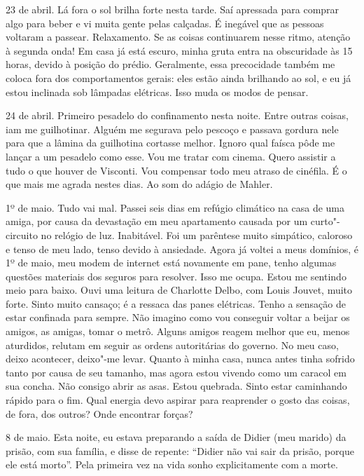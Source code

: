 23 de abril. Lá fora o sol brilha forte nesta tarde. Saí apressada para
comprar algo para beber e vi muita gente pelas calçadas. É inegável que
as pessoas voltaram a passear. Relaxamento. Se as coisas continuarem
nesse ritmo, atenção à segunda onda! Em casa já está escuro, minha gruta
entra na obscuridade às 15 horas, devido à posição do prédio.
Geralmente, essa precocidade também me coloca fora dos comportamentos
gerais: eles estão ainda brilhando ao sol, e eu já estou inclinada sob
lâmpadas elétricas. Isso muda os modos de pensar.

24 de abril. Primeiro pesadelo do confinamento nesta noite. Entre outras
coisas, iam me guilhotinar. Alguém me segurava pelo pescoço e passava
gordura nele para que a lâmina da guilhotina cortasse melhor. Ignoro
qual faísca pôde me lançar a um pesadelo como esse. Vou me tratar com
cinema. Quero assistir a tudo o que houver de Visconti. Vou compensar
todo meu atraso de cinéfila. É o que mais me agrada nestes dias. Ao som
do adágio de Mahler.

1º de maio. Tudo vai mal. Passei seis dias em refúgio climático na casa
de uma amiga, por causa da devastação em meu apartamento causada por um
curto"-circuito no relógio de luz. Inabitável. Foi um parêntese muito
simpático, caloroso e tenso de meu lado, tenso devido à ansiedade. Agora
já voltei a meus domínios, é 1º de maio, meu modem de internet está
novamente em pane, tenho algumas questões materiais dos seguros para
resolver. Isso me ocupa. Estou me sentindo meio para baixo. Ouvi uma
leitura de Charlotte Delbo, com Louis Jouvet, muito forte. Sinto muito
cansaço; é a ressaca das panes elétricas. Tenho a sensação de estar
confinada para sempre. Não imagino como vou conseguir voltar a beijar os
amigos, as amigas, tomar o metrô. Alguns amigos reagem melhor que eu,
menos aturdidos, relutam em seguir as ordens autoritárias do governo. No
meu caso, deixo acontecer, deixo"-me levar. Quanto à minha casa, nunca
antes tinha sofrido tanto por causa de seu tamanho, mas agora estou
vivendo como um caracol em sua concha. Não consigo abrir as asas. Estou
quebrada. Sinto estar caminhando rápido para o fim. Qual energia devo
aspirar para reaprender o gosto das coisas, de fora, dos outros? Onde
encontrar forças?

8 de maio. Esta noite, eu estava preparando a saída de Didier (meu
marido) da prisão, com sua família, e disse de repente: ``Didier não vai
sair da prisão, porque ele está morto''. Pela primeira vez na vida sonho
explicitamente com a morte.

